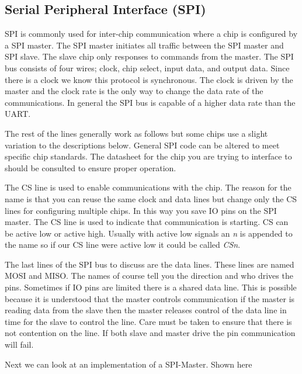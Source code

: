 \subsection{Serial Peripheral Interface (SPI)}

\ac{SPI} is commonly used for inter-chip communication where a chip is configured by a SPI master. The SPI master initiates all traffic between the SPI master and SPI slave. The slave chip only responses to commands from the master. The SPI bus consists of four wires; clock, chip select, input data, and output data. Since there is a clock we know this protocol is synchronous. The clock is driven by the master and the clock rate is the only way to change the data rate of the communications. In general the \ac{SPI} bus is capable of a higher data rate than the UART.

The rest of the lines generally work as follows but some chips use a slight variation to the descriptions below. General \ac{SPI} code can be altered to meet specific chip standards. The datasheet for the chip you are trying to interface to should be consulted to ensure proper operation. 

The \ac{CS} line is used to enable communications with the chip. The reason for the name is that you can reuse the same clock and data lines but change only the \ac{CS} lines for configuring multiple chips. In this way you save \ac{IO} pins on the \ac{SPI} master. The CS line is used to indicate that communication is starting. \ac{CS} can be active low or active high. Usually with active low signals an \emph{n} is appended to the name so if our \ac{CS} line were active low it could be called \emph{CSn}. 

The last lines of the \ac{SPI} bus to discuss are the data lines. These lines are named \ac{MOSI} and \ac{MISO}. The names of course tell you the direction and who drives the pins. Sometimes if \ac{IO} pins are limited there is a shared data line. This is possible because it is understood that the master controls communication if the master is reading data from the slave then the master releases control of the data line in time for the slave to control the line. Care must be taken to ensure that there is not contention on the line. If both slave and master drive the pin communication will fail. 	

Next we can look at an implementation of a \ac{SPI}-Master. Shown here

